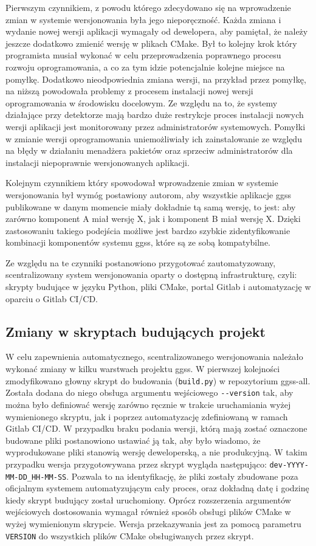Pierwszym czynnikiem, z powodu którego zdecydowano się na wprowadzenie zmian w systemie wersjonowania była jego nieporęczność. Każda zmiana i wydanie nowej wersji aplikacji wymagały od dewelopera, aby pamiętał, że należy jeszcze dodatkowo zmienić wersję w plikach CMake. Był to kolejny krok który programista musiał wykonać w celu przeprowadzenia poprawnego procesu rozwoju oprogramowania, a co za tym idzie potencjalnie kolejne miejsce na pomyłkę. Dodatkowo nieodpowiednia zmiana wersji, na przykład przez pomyłkę, na niższą powodowała problemy z procesem instalacji nowej wersji oprogramowania w środowisku docelowym. Ze względu na to, że systemy działające przy detektorze mają bardzo duże restrykcje proces instalacji nowych wersji aplikacji jest monitorowany przez administratorów systemowych. Pomyłki w zmianie wersji oprogramowania uniemożliwiały ich zainstalowanie ze względu na błędy w działaniu menadżera pakietów oraz sprzeciw administratorów dla instalacji niepoprawnie wersjonowanych aplikacji.

Kolejnym czynnikiem który spowodował wprowadzenie zmian w systemie wersjonowania był wymóg postawiony autorom, aby wszystkie aplikacje ggss publikowane w danym momencie miały dokładnie tą samą wersję, to jest: aby zarówno komponent A miał wersję X, jak i komponent B miał wersję X. Dzięki zastosowaniu takiego podejścia możliwe jest bardzo szybkie zidentyfikowanie kombinacji komponentów systemu ggss, które są ze sobą kompatybilne.

Ze względu na te czynniki postanowiono przygotować zautomatyzowany, scentralizowany system wersjonowania oparty o dostępną infrastrukturę, czyli: skrypty budujące w języku Python, pliki CMake, portal Gitlab i automatyzację w oparciu o Gitlab CI/CD.

\subsection{Zmiany w skryptach budujących projekt}

W celu zapewnienia automatycznego, scentralizowanego wersjonowania należało wykonać zmiany w kilku warstwach projektu ggss. W pierwszej kolejności zmodyfikowano głowny skrypt do budowania (\lstinline{build.py}) w repozytorium ggss-all. Została dodana do niego obsługa argumentu wejściowego \lstinline{--version} tak, aby można było definiować wersję zarówno ręcznie w trakcie uruchamiania wyżej wymienionego skryptu, jak i poprzez automatyzację zdefiniowaną w ramach Gitlab CI/CD. W przypadku braku podania wersji, którą mają zostać oznaczone budowane pliki postanowiono ustawiać ją tak, aby było wiadomo, że wyprodukowane pliki stanowią wersję deweloperską, a nie produkcyjną. W takim przypadku wersja przygotowywana przez skrypt wygląda następująco: \lstinline{dev-YYYY-MM-DD_HH-MM-SS}. Pozwala to na identyfikację, że pliki zostały zbudowane poza oficjalnym systemem automatyzującym cały proces, oraz dokładną datę i godzinę kiedy skrypt budujący został uruchomiony. Oprócz rozszerzenia argumentów wejściowych dostosowania wymagał również sposób obsługi plików CMake w wyżej wymienionym skrypcie. Wersja przekazywania jest za pomocą parametru \lstinline{VERSION} do wszystkich plików CMake obsługiwanych przez skrypt.

